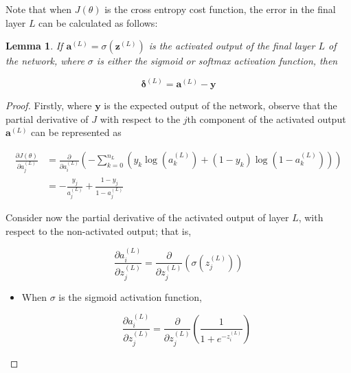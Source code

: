 \documentclass{article}[11pt]
\newtheorem{lemma}{Lemma}
\begin{document}
        Note that when $J(\theta)$ is the cross entropy cost function, the error in the final layer $L$ can be calculated as follows:
        
        \begin{lemma}
            If $\mathbf{a}^{(L)} = \sigma(\mathbf{z}^{(L)})$ is the activated output of the final layer $L$ of the network, where $\sigma$ is either the sigmoid or softmax activation function, then
            
            $$
            \mathbf{\delta}^{(L)} = \mathbf{a}^{(L)} - \mathbf{y}
            $$
            
        \end{lemma}
        
        
        \begin{proof}
            
            Firstly, where $\mathbf{y}$ is the expected output of the network, observe that the partial derivative of $J$ with respect to the $j$th component of the activated output $\mathbf{a}^{(L)}$ can be represented as
                    
            $$ \begin{aligned}
            \frac{\partial J(\theta)}{\partial a^{(L)}_j}
            &= \frac{\partial}{\partial a^{(L)}_i} \left( - \sum_{k=0}^{n_L} \left( y_k \log(a^{(L)}_k) + (1 - y_k) \log(1 - a^{(L)}_k) \right) \right) \\
            &= - \frac{y_j}{a^{(L)}_j} + \frac{1 - y_j}{1 - a^{(L)}_j}
            \end{aligned} $$
            
            Consider now the partial derivative of the activated output of layer $L$, with respect to the non-activated output; that is,
            
            $$
            \frac{\partial a^{(L)}_i}{\partial z^{(L)}_j} = \frac{\partial}{\partial z^{(L)}_j} \left( \sigma(z^{(L)}_j) \right)
            $$
            
             
            \begin{itemize}
                
                \item When $\sigma$ is the sigmoid activation function,
            
                $$
                \frac{\partial a^{(L)}_i}{\partial z^{(L)}_j} = \frac{\partial}{\partial z^{(L)}_j} \left( \frac{1}{1 + e^{-z^{(L)}_i}} \right)
                $$
                

\end{itemize}
\end{proof}
\end{document}
